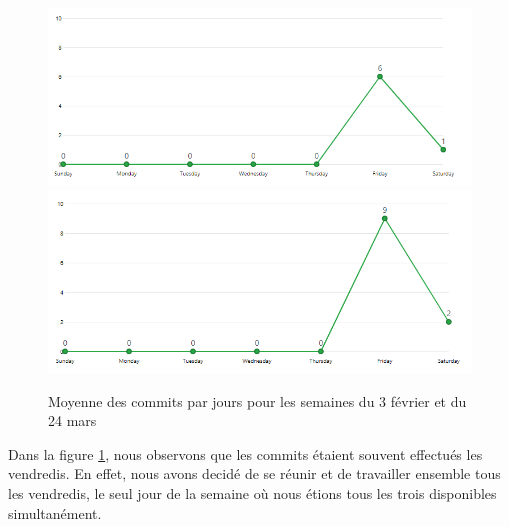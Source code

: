 \documentclass[12pt,a4paper]{report}
\begin{document}
%
\begin{figure}[!ht]
\hspace*{-4cm}
\includegraphics[scale=0.60]{images/contributor_week_feb3.PNG}
\hspace*{1.6cm}
\includegraphics[scale=0.60]{images/contributor_week_march24.PNG}
\caption{Moyenne des commits par jours pour les semaines du 3 février et du 24 mars}
\label{fig:mean_commits}
\end{figure}

Dans la figure \textcolor{BrickRed}{\ref{fig:mean_commits}}, nous observons que les commits étaient souvent effectués les vendredis. En effet, nous avons decidé de se réunir et de travailler ensemble tous les vendredis, le seul jour de la semaine où nous étions tous les trois disponibles simultanément.
\end{document}
